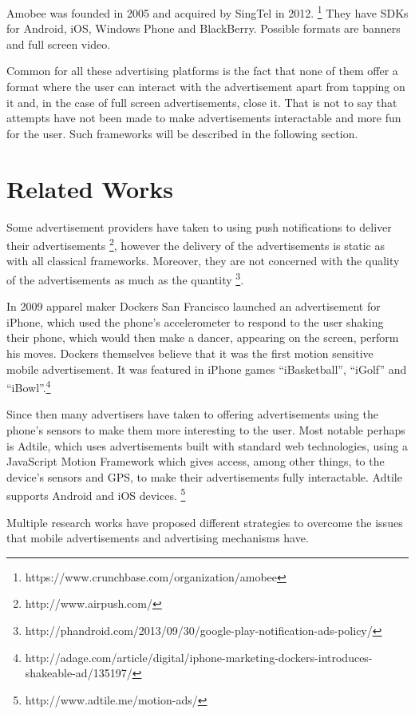Amobee was founded in 2005 and acquired by SingTel in 2012. \footnote{https://www.crunchbase.com/organization/amobee} They have SDKs for Android, iOS, Windows Phone and BlackBerry. Possible formats are banners and full screen video.

Common for all these advertising platforms is the fact that none of them offer a format where the user can interact with the advertisement apart from tapping on it and, in the case of full screen advertisements, close it. That is not to say that attempts have not been made to make advertisements interactable and more fun for the user. Such frameworks will be described in the following section.

\section{Related Works}

Some advertisement providers have taken to using push notifications to deliver their advertisements \footnote{http://www.airpush.com/}, however the delivery of the advertisements is static as with all classical frameworks. Moreover, they are not concerned with the quality of the advertisements as much as the quantity \footnote{http://phandroid.com/2013/09/30/google-play-notification-ads-policy/}.

In 2009 apparel maker Dockers San Francisco launched an advertisement for iPhone, which used the phone's accelerometer to respond to the user shaking their phone, which would then make a dancer, appearing on the screen, perform his moves. Dockers themselves believe that it was the first motion sensitive mobile advertisement. It was featured in iPhone games “iBasketball”, “iGolf” and “iBowl”.\footnote{http://adage.com/article/digital/iphone-marketing-dockers-introduces-shakeable-ad/135197/}

Since then many advertisers have taken to offering advertisements using the phone’s sensors to make them more interesting to the user. Most notable perhaps is Adtile, which uses advertisements built with standard web technologies, using a JavaScript Motion Framework which gives access, among other things, to the device’s sensors and GPS, to make their advertisements fully interactable. Adtile supports Android and iOS devices. \footnote{http://www.adtile.me/motion-ads/}

Multiple research works have proposed different strategies to overcome the issues that mobile advertisements and advertising mechanisms have.

